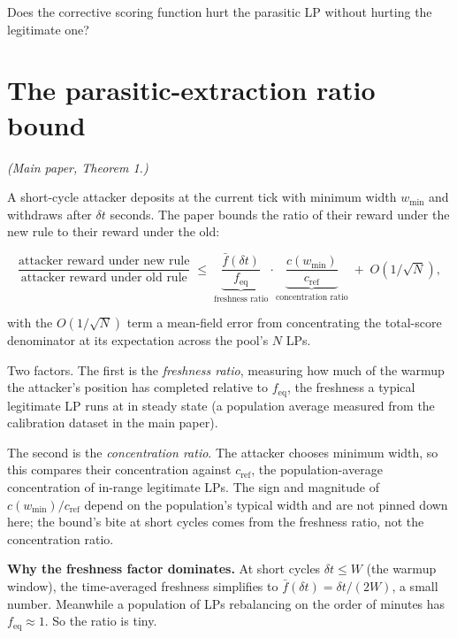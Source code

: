 \documentclass[11pt,a4paper]{article}
\begin{document}
Does the corrective scoring function hurt the parasitic LP without hurting the legitimate one?

\section{The parasitic-extraction ratio bound}

\emph{(Main paper, Theorem 1.)}

A short-cycle attacker deposits at the current tick with minimum width $w_{\min}$ and withdraws after $\delta t$ seconds. The paper bounds the ratio of their reward under the new rule to their reward under the old:

\begin{result}
\[
\frac{\text{attacker reward under new rule}}{\text{attacker reward under old rule}} \;\leq\; \underbrace{\frac{\bar f(\delta t)}{f_{\text{eq}}}}_{\text{freshness ratio}} \cdot \underbrace{\frac{c(w_{\min})}{c_{\text{ref}}}}_{\text{concentration ratio}} \;+\; O(1/\sqrt N),
\]
\end{result}

with the $O(1/\sqrt N)$ term a mean-field error from concentrating the total-score denominator at its expectation across the pool's $N$ LPs.

Two factors. The first is the \emph{freshness ratio}, measuring how much of the warmup the attacker's position has completed relative to $f_{\text{eq}}$, the freshness a typical legitimate LP runs at in steady state (a population average measured from the calibration dataset in the main paper).

The second is the \emph{concentration ratio}. The attacker chooses minimum width, so this compares their concentration against $c_{\text{ref}}$, the population-average concentration of in-range legitimate LPs. The sign and magnitude of $c(w_{\min})/c_{\text{ref}}$ depend on the population's typical width and are not pinned down here; the bound's bite at short cycles comes from the freshness ratio, not the concentration ratio.

\textbf{Why the freshness factor dominates.} At short cycles $\delta t \le W$ (the warmup window), the time-averaged freshness simplifies to $\bar f(\delta t) = \delta t/(2W)$, a small number. Meanwhile a population of LPs rebalancing on the order of minutes has $f_{\text{eq}} \approx 1$. So the ratio is tiny.
\end{document}
